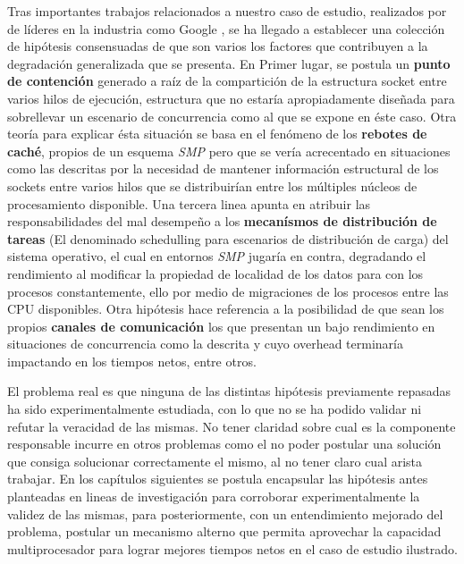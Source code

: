 Tras importantes trabajos relacionados a nuestro caso de estudio, realizados por de líderes en la industria como Google  \cite{slides:googleReuseport}, se ha llegado a establecer una colección de hipótesis consensuadas de que son varios los factores que contribuyen a la degradación generalizada que se presenta. En Primer lugar, se postula un \textbf{punto de contención} generado a raíz de la compartición de la estructura socket entre varios hilos de ejecución, estructura que no estaría apropiadamente diseñada para sobrellevar un escenario de concurrencia como al que se expone en éste caso. Otra teoría para explicar ésta situación se basa en el fenómeno de los \textbf{rebotes de caché}, propios de un esquema \emph{SMP} pero que se vería acrecentado en situaciones como las descritas por la necesidad de mantener información estructural de los sockets entre varios hilos que se distribuirían entre los múltiples núcleos de procesamiento disponible. Una tercera linea apunta en atribuir las responsabilidades del mal desempeño a los \textbf{mecanísmos de distribución de tareas} (El denominado schedulling para escenarios de distribución de carga) del sistema operativo, el cual en entornos \emph{SMP} jugaría en contra, degradando el rendimiento al modificar la propiedad de localidad de los datos para con los procesos constantemente, ello por medio de migraciones de los procesos entre las CPU disponibles. Otra hipótesis hace referencia a la posibilidad de que sean los propios \textbf{canales de comunicación} los que presentan un bajo rendimiento en situaciones de concurrencia como la descrita y cuyo overhead terminaría impactando en los tiempos netos, entre otros.

El problema real es que ninguna de las distintas hipótesis previamente repasadas ha sido experimentalmente estudiada, con lo que no se ha podido validar ni refutar la veracidad de las mismas. No tener claridad sobre cual es la componente responsable incurre en otros problemas como el no poder postular una solución que consiga solucionar correctamente el mismo, al no tener claro cual arista trabajar. En los capítulos siguientes se postula encapsular las hipótesis antes planteadas en lineas de investigación para corroborar experimentalmente la validez de las mismas, para posteriormente, con un entendimiento mejorado del problema, postular un mecanismo alterno que permita aprovechar la capacidad multiprocesador para lograr mejores tiempos netos en el caso de estudio ilustrado.